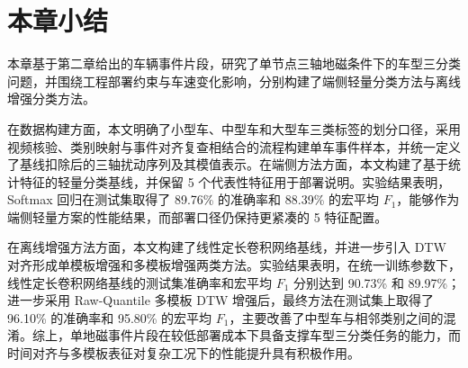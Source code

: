 \section{本章小结}
\label{sec:ch3_summary}

本章基于第二章给出的车辆事件片段，研究了单节点三轴地磁条件下的车型三分类问题，并围绕工程部署约束与车速变化影响，分别构建了端侧轻量分类方法与离线增强分类方法。

在数据构建方面，本文明确了小型车、中型车和大型车三类标签的划分口径，采用视频核验、类别映射与事件对齐复查相结合的流程构建单车事件样本，并统一定义了基线扣除后的三轴扰动序列及其模值表示。在端侧方法方面，本文构建了基于统计特征的轻量分类基线，并保留 5 个代表性特征用于部署说明。实验结果表明，Softmax 回归在测试集取得了 89.76\% 的准确率和 88.39\% 的宏平均 $F_1$，能够作为端侧轻量方案的性能结果，而部署口径仍保持更紧凑的 5 特征配置。

在离线增强方法方面，本文构建了线性定长卷积网络基线，并进一步引入 DTW 对齐形成单模板增强和多模板增强两类方法。实验结果表明，在统一训练参数下，线性定长卷积网络基线的测试集准确率和宏平均 $F_1$ 分别达到 90.73\% 和 89.97\%；进一步采用 Raw-Quantile 多模板 DTW 增强后，最终方法在测试集上取得了 96.10\% 的准确率和 95.80\% 的宏平均 $F_1$，主要改善了中型车与相邻类别之间的混淆。综上，单地磁事件片段在较低部署成本下具备支撑车型三分类任务的能力，而时间对齐与多模板表征对复杂工况下的性能提升具有积极作用。




